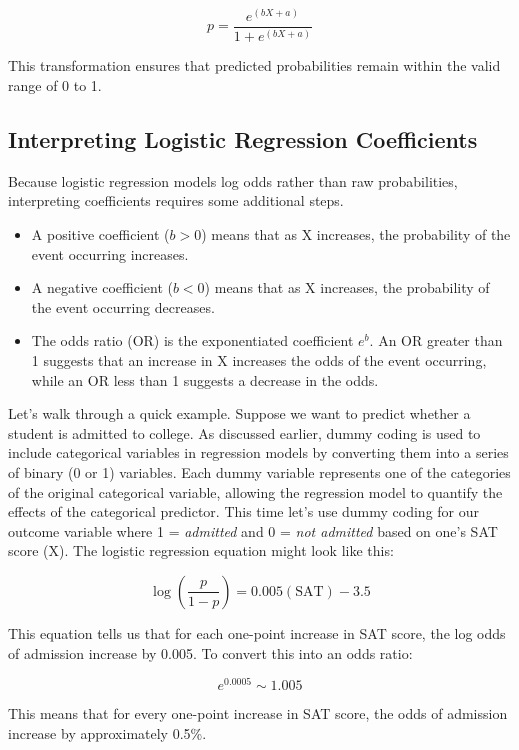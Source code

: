 \documentclass[
  letterpaper,
  DIV=11,
  numbers=noendperiod]{scrreprt}
\begin{document}
\[
p = \frac{e^{(bX + a)}}{1 + e^{(bX + a)}}
\]

This transformation ensures that predicted probabilities remain within
the valid range of 0 to 1.

\subsection{Interpreting Logistic Regression
Coefficients}\label{interpreting-logistic-regression-coefficients}

Because logistic regression models log odds rather than raw
probabilities, interpreting coefficients requires some additional steps.

\begin{itemize}
\item
  A positive coefficient (\(b > 0\)) means that as X increases, the
  probability of the event occurring increases.
\item
  A negative coefficient (\(b < 0\)) means that as X increases, the
  probability of the event occurring decreases.
\item
  The odds ratio (OR) is the exponentiated coefficient \(e^b\). An OR
  greater than 1 suggests that an increase in X increases the odds of
  the event occurring, while an OR less than 1 suggests a decrease in
  the odds.
\end{itemize}

Let's walk through a quick example. Suppose we want to predict whether a
student is admitted to college. As discussed earlier, dummy coding is
used to include categorical variables in regression models by converting
them into a series of binary (0 or 1) variables. Each dummy variable
represents one of the categories of the original categorical variable,
allowing the regression model to quantify the effects of the categorical
predictor. This time let's use dummy coding for our outcome variable
where 1 = \emph{admitted} and 0 = \emph{not admitted} based on one's SAT
score (X). The logistic regression equation might look like this:

\[
\log\left(\frac{p}{1 - p}\right) = 0.005(\text{SAT}) - 3.5
\]

This equation tells us that for each one-point increase in SAT score,
the log odds of admission increase by 0.005. To convert this into an
odds ratio:

\[
e^{0.0005} \sim 1.005
\]

This means that for every one-point increase in SAT score, the odds of
admission increase by approximately 0.5\%.
\end{document}
